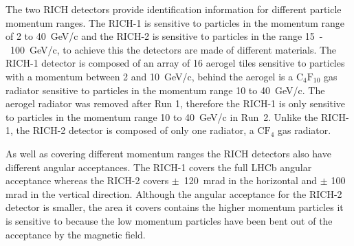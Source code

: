 

The two RICH detectors provide identification information for different particle momentum ranges. The RICH-1 is sensitive to particles in the momentum range of 2 to 40~GeV/c and the RICH-2 is sensitive to particles in the range 15~-~100~GeV/c, to achieve this the detectors are made of different materials.  
The RICH-1 detector is composed of an array of 16 aerogel tiles sensitive to particles with a momentum between 2 and 10~GeV/c, behind the aerogel is a $\text{C}_{4}\text{F}_{10}$ gas radiator sensitive to particles in the momentum range 10 to 40~GeV/c. The aerogel radiator was removed after Run 1, therefore the RICH-1 is only sensitive to particles in the momentum range 10 to 40~GeV/c in Run~2. Unlike the RICH-1, the RICH-2 detector is composed of only one radiator, a $\text{C}\text{F}_{4}$ gas radiator.

As well as covering different momentum ranges the RICH detectors also have different angular acceptances. The RICH-1 covers the full LHCb angular acceptance whereas the RICH-2 covers $\pm$~120~mrad in the horizontal and $\pm$ 100 mrad in the vertical direction. 
Although the angular acceptance for the RICH-2 detector is smaller, the area it covers contains the higher momentum particles it is sensitive to because the low momentum particles have been bent out of the acceptance by the magnetic field.

